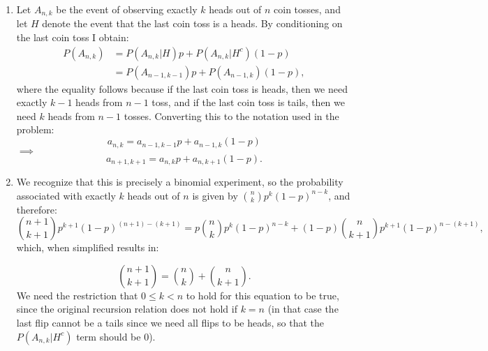 \begin{problem}{2} $ $

	\begin{enumerate}
		\item Let $A_{n,k}$ be the event of observing exactly $k$ heads out of $n$ coin tosses, and let $H$ denote the event that the last coin toss is a heads.  By conditioning on the last coin toss I obtain:
		\begin{align*}
		P(A_{n, k}) &= P(A_{n, k}|H)p+P(A_{n, k}|H^c)(1-p) \\
		&= P(A_{n-1, k-1})p+P(A_{n-1, k})(1-p),
		\end{align*}
where the equality follows because if the last coin toss is heads, then we need exactly $k-1$ heads from $n-1$ toss, and if the last coin toss is tails, then we need $k$ heads from $n-1$ tosses.  Converting this to the notation used in the problem:
		\begin{equation*}
		a_{n,k}= a_{n-1, k-1}p+a_{n-1, k}(1-p)
		\end{equation*}
$\implies$
		\begin{equation*}
		a_{n+1,k+1}= a_{n, k}p+a_{n, k+1}(1-p).
		\end{equation*}

\item We recognize that this is precisely a binomial experiment, so the probability associated with exactly $k$ heads out of $n$ is given by $\binom{n}{k} p^k (1-p)^{n-k}$, and therefore:
		\begin{equation*}
		\binom{n+1}{k+1} p^{k+1} (1-p)^{(n+1)-(k+1)}= p\binom{n}{k} p^k (1-p)^{n-k}+(1-p)\binom{n}{k+1} p^{k+1} (1-p)^{n-(k+1)},
		\end{equation*}
which, when simplified results in:

		\begin{equation*}
		\binom{n+1}{k+1}= \binom{n}{k}+\binom{n}{k+1}.
		\end{equation*}
We need the restriction that $0 \le k <n$ to hold for this equation to be true, since the original recursion relation does not hold if $k = n$ (in that case the last flip cannot be a tails since we need all flips to be heads, so that the $P(A_{n, k}|H^c)$ term should be 0).




\end{enumerate}
\end{problem}










